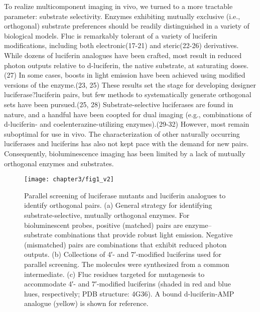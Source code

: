 \par
To realize multicomponent imaging in vivo, we turned to a more tractable parameter: substrate selectivity. Enzymes exhibiting mutually exclusive (i.e., orthogonal) substrate preferences should be readily distinguished in a variety of biological models. Fluc is remarkably tolerant of a variety of luciferin modifications, including both electronic\cite{Woodroofe:2012vx,McCutcheon:2012ixb,Conley:2012gha,Kuchimaru:2016eba,BRANCHING:1989ct}(17-21) and steric\cite{Steinhardt:2016in,Jones:2017be,Jathoul:2014do,Woodroofe:2008faa,Mofford:2014iwa}(22-26) derivatives. While dozens of luciferin analogues have been crafted, most result in reduced photon outputs relative to d-luciferin, the native substrate, at saturating doses.\cite{Rathbun:2017kj}(27) In some cases, boosts in light emission have been achieved using modified versions of the enzyme.\cite{Mofford:2014iwa,Jones:2017be}(23, 25) These results set the stage for developing designer luciferase?luciferin pairs, but few methods to systematically generate orthogonal sets have been pursued.\cite{Jones:2017be,Nishihara:2017bd}(25, 28) Substrate-selective luciferases are found in nature, and a handful have been coopted for dual imaging (e.g., combinations of d-luciferin- and coelenterazine-utilizing enzymes).\cite{Petushkov:2014ha,Kaskova:2017ed,Paley:2014ila,Stacer:2013el}(29-32) However, most remain suboptimal for use in vivo. The characterization of other naturally occurring luciferases and luciferins has also not kept pace with the demand for new pairs. Consequently, bioluminescence imaging has been limited by a lack of mutually orthogonal enzymes and substrates.
\par
\begin{figure}[htb]
\texttt{[image: chapter3/fig1\_v2]}
\centering
\caption[Parallel screening of luciferase mutants and luciferin analogues to identify orthogonal pairs]{Parallel screening of luciferase mutants and luciferin analogues to identify orthogonal pairs. (a) General strategy for identifying substrate-selective, mutually orthogonal enzymes. For bioluminescent probes, positive (matched) pairs are enzyme–substrate combinations that provide robust light emission. Negative (mismatched) pairs are combinations that exhibit reduced photon outputs. (b) Collections of 4′- and 7′-modified luciferins used for parallel screening. The molecules were synthesized from a common intermediate. (c) Fluc residues targeted for mutagenesis to accommodate 4′- and 7′-modified luciferins (shaded in red and blue hues, respectively; PDB structure: 4G36). A bound d-luciferin-AMP analogue (yellow) is shown for reference.}
  \label{fig:overview}
\end{figure}
